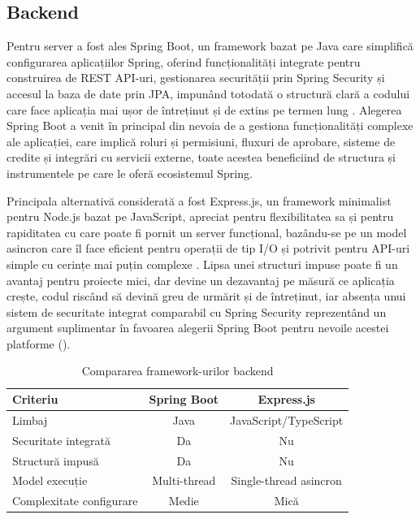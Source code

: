 \subsection{Backend}
Pentru server a fost ales Spring Boot, un framework bazat pe Java care simplifică configurarea aplicațiilor Spring, oferind funcționalități integrate pentru construirea de REST API-uri, gestionarea securității prin Spring Security și accesul la baza de date prin JPA, impunând totodată o structură clară a codului care face aplicația mai ușor de întreținut și de extins pe termen lung \cite{springboot}. Alegerea Spring Boot a venit în principal din nevoia de a gestiona funcționalități complexe ale aplicației, care implică roluri și permisiuni, fluxuri de aprobare, sisteme de credite și integrări cu servicii externe, toate acestea beneficiind de structura și instrumentele pe care le oferă ecosistemul Spring.

Principala alternativă considerată a fost Express.js, un framework minimalist pentru Node.js bazat pe JavaScript, apreciat pentru flexibilitatea sa și pentru rapiditatea cu care poate fi pornit un server funcțional, bazându-se pe un model asincron care îl face eficient pentru operații de tip I/O și potrivit pentru API-uri simple cu cerințe mai puțin complexe \cite{expressjs}. Lipsa unei structuri impuse poate fi un avantaj pentru proiecte mici, dar devine un dezavantaj pe măsură ce aplicația crește, codul riscând să devină greu de urmărit și de întreținut, iar absența unui sistem de securitate integrat comparabil cu Spring Security reprezentând un argument suplimentar în favoarea alegerii Spring Boot pentru nevoile acestei platforme ().

\begin{table}[htbp]
    \centering
    \small
    \begin{tabular}{l c c}
        \toprule
        \textbf{Criteriu} & \textbf{Spring Boot} & \textbf{Express.js} \\
        \midrule
        Limbaj & Java & JavaScript/TypeScript \\
        Securitate integrată & Da & Nu \\
        Structură impusă & Da & Nu \\
        Model execuție & Multi-thread & Single-thread asincron \\
        Complexitate configurare & Medie & Mică \\
        \bottomrule
    \end{tabular}
    \caption{Compararea framework-urilor backend}
    \label{tab:backend-comparison}
\end{table}

